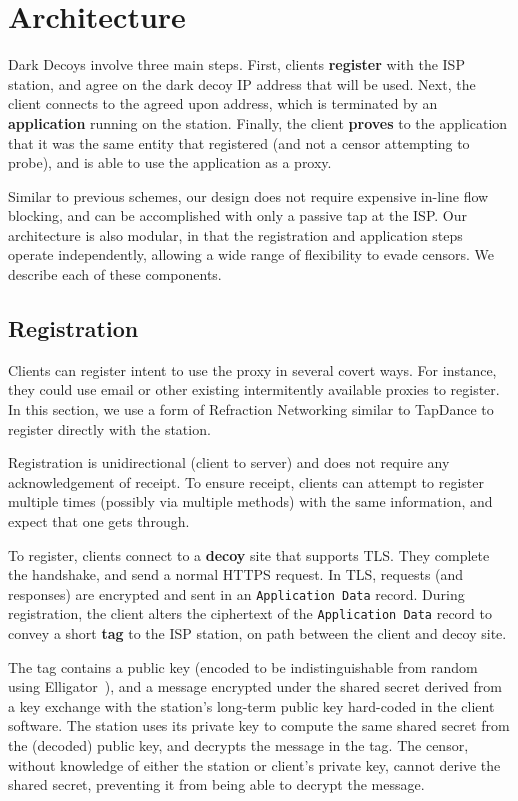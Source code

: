 \documentclass[letterpaper,twocolumn,10pt]{article}
\begin{document}
\section{Architecture}

Dark Decoys involve three main steps. First, clients \textbf{register} with the
ISP station,
and agree on the dark decoy IP address that will be used. Next, the client
connects to the agreed upon address, which is terminated by an
\textbf{application} running on the station. Finally, the client \textbf{proves}
to the application that it was the same entity that registered (and not a censor
attempting to probe), and is able to use the application as a proxy.

Similar to previous schemes, our design does not require expensive in-line
flow blocking, and can be accomplished with only a passive tap at the ISP.
Our architecture is also modular, in that the registration and application steps operate
independently, allowing a wide range of flexibility to evade censors. We
describe each of these components.

\subsection{Registration}

Clients can register intent to use the proxy in several covert ways. For
instance, they could use email or other existing intermitently available proxies
to register. In this section, we use a form of Refraction Networking similar to
TapDance to register directly with the station.

Registration is unidirectional (client to server) and does not require any
acknowledgement of receipt. To ensure receipt, clients can attempt to register
multiple times (possibly via multiple methods) with the same information, and expect
that one gets through.

\medskip

To register, clients connect to a \textbf{decoy} site that supports TLS. They
complete the handshake, and send a normal HTTPS request. In TLS, requests (and
responses) are encrypted and sent in an \texttt{Application Data} record. During
registration, the client alters the ciphertext of the \texttt{Application Data} record to
convey a short \textbf{tag} to the ISP station, on path between the client and
decoy site.

The tag contains a public key (encoded to be indistinguishable from random using
Elligator~\cite{elligator}), and a message encrypted under the shared secret
derived from a key exchange with the station's long-term public key hard-coded
in the client software. The station uses its private key to compute the same
shared secret from the (decoded) public key, and decrypts the message in the
tag. The censor, without knowledge of either the station or client's private
key, cannot derive the shared secret, preventing it from being able to decrypt
the message.
\end{document}
